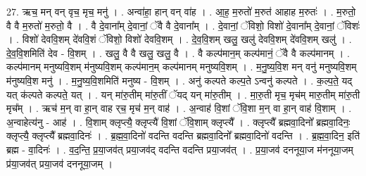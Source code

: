 \documentclass[17pt]{extarticle}
\begin{document}
27. ऋच॒ मन् वन् वृच॒ मृच॒ मनु॑ । . अन्वा॑हा॒ हान् वन् वा॑ह । . आ॒ह॒ म॒रुतो॑ म॒रुत॑ आहाह म॒रुतः॑ । . म॒रुतो॒ वै वै म॒रुतो॑ म॒रुतो॒ वै । . वै दे॒वाना᳚म् दे॒वानां॒ ॅवै वै दे॒वाना᳚म् । . दे॒वानां॒ ॅविशो॒ विशो॑ दे॒वाना᳚म् दे॒वानां॒ ॅविशः॑ । . विशो॑ देववि॒शम् दे॑ववि॒शं ॅविशो॒ विशो॑ देववि॒शम् । . दे॒व॒वि॒शम् खलु॒ खलु॑ देववि॒शम् दे॑ववि॒शम् खलु॑ । . दे॒व॒वि॒शमिति॑ देव - वि॒शम् । . खलु॒ वै वै खलु॒ खलु॒ वै । . वै कल्प॑मान॒म् कल्प॑मानं॒ ॅवै वै कल्प॑मानम् । . कल्प॑मानम् मनुष्यवि॒शम् म॑नुष्यवि॒शम् कल्प॑मान॒म् कल्प॑मानम् मनुष्यवि॒शम् । . म॒नु॒ष्य॒वि॒श मन् वनु॑ मनुष्यवि॒शम् म॑नुष्यवि॒श मनु॑ । . म॒नु॒ष्य॒वि॒शमिति॑ मनुष्य - वि॒शम् । . अनु॑ कल्पते कल्प॒ते ऽन्वनु॑ कल्पते । . क॒ल्प॒ते॒ यद् यत् क॑ल्पते कल्पते॒ यत् । . यन् मा॑रु॒तीम् मा॑रु॒तीं ॅयद् यन् मा॑रु॒तीम् । . मा॒रु॒ती मृच॒ मृच॑म् मारु॒तीम् मा॑रु॒ती मृच᳚म् । . ऋच॑ म॒न् वा हा॒न् वाह र्‌च॒ मृच॑ म॒न् वाह॑ । . अ॒न्वाह॑ वि॒शां ॅवि॒शा म॒न् वा हा॒न् वाह॑ वि॒शाम् । . अ॒न्वाहेत्य॑नु - आह॑ । . वि॒शाम् क्लृप्त्यै॒ क्लृप्त्यै॑ वि॒शां ॅवि॒शाम् क्लृप्त्यै᳚ । . क्लृप्त्यै᳚ ब्रह्मवा॒दिनो᳚ ब्रह्मवा॒दिनः॒ क्लृप्त्यै॒ क्लृप्त्यै᳚ ब्रह्मवा॒दिनः॑ । . ब्र॒ह्म॒वा॒दिनो॑ वदन्ति वदन्ति ब्रह्मवा॒दिनो᳚ ब्रह्मवा॒दिनो॑ वदन्ति । . ब्र॒ह्म॒वा॒दिन॒ इति॑ ब्रह्म - वा॒दिनः॑ । . व॒द॒न्ति॒ प्र॒या॒जव॑त् प्रया॒जव॑द् वदन्ति वदन्ति प्रया॒जव॑त् । . प्र॒या॒जव॑ दननूया॒ज म॑ननूया॒जम् प्र॑या॒जव॑त् प्रया॒जव॑ दननूया॒जम् । \newline
\end{document}

